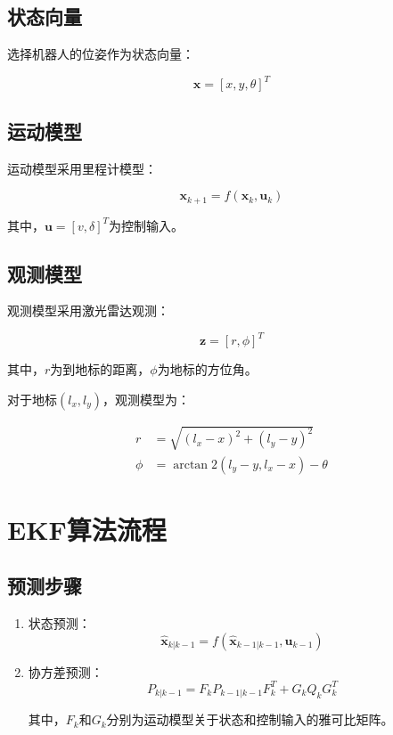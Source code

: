 \documentclass[12pt,a4paper]{report}
\begin{document}
\subsection{状态向量}

选择机器人的位姿作为状态向量：

\begin{equation}
\mathbf{x} = [x, y, \theta]^T
\end{equation}

\subsection{运动模型}

运动模型采用里程计模型：

\begin{equation}
\mathbf{x}_{k+1} = f(\mathbf{x}_k, \mathbf{u}_k)
\end{equation}

其中，$\mathbf{u} = [v, \delta]^T$为控制输入。

\subsection{观测模型}

观测模型采用激光雷达观测：

\begin{equation}
\mathbf{z} = [r, \phi]^T
\end{equation}

其中，$r$为到地标的距离，$\phi$为地标的方位角。

对于地标$(l_x, l_y)$，观测模型为：

\begin{align}
r &= \sqrt{(l_x - x)^2 + (l_y - y)^2} \\
\phi &= \arctan2(l_y - y, l_x - x) - \theta
\end{align}

\section{EKF算法流程}

\subsection{预测步骤}

\begin{enumerate}[itemsep=0pt]
    \item 状态预测：
    \begin{equation}
    \hat{\mathbf{x}}_{k|k-1} = f(\hat{\mathbf{x}}_{k-1|k-1}, \mathbf{u}_{k-1})
    \end{equation}
    
    \item 协方差预测：
    \begin{equation}
    P_{k|k-1} = F_k P_{k-1|k-1} F_k^T + G_k Q_k G_k^T
    \end{equation}
    
    其中，$F_k$和$G_k$分别为运动模型关于状态和控制输入的雅可比矩阵。
\end{enumerate}
\end{document}
